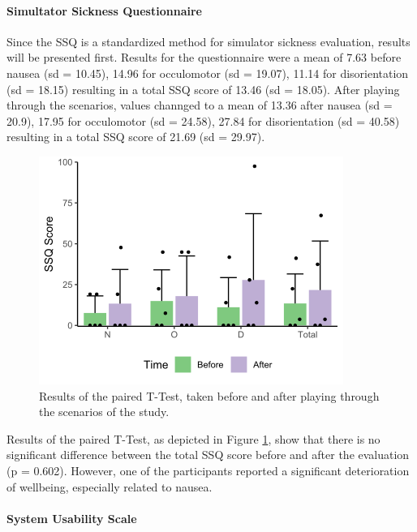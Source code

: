 \paragraph{Simultator Sickness Questionnaire}

Since the SSQ is a standardized method for simulator sickness evaluation, 
results will be presented first.
Results for the questionnaire were a mean of 7.63 before
nausea (sd = 10.45), 14.96 for occulomotor (sd = 19.07),
11.14 for disorientation (sd = 18.15)  resulting in 
a total SSQ score of 13.46 (sd = 18.05).
After playing through the scenarios, values channged to
a mean of 13.36 after
nausea (sd = 20.9), 17.95 for occulomotor (sd = 24.58),
27.84 for disorientation (sd = 40.58) resulting in 
a total SSQ score of 21.69 (sd = 29.97).

\begin{figure}[ht]
    \centering
    \includegraphics[width=0.7\linewidth]{images/evaluation/VR-SSQ.png}
    \caption{\label{fig::ssq}Results of the paired T-Test,
    taken before and after playing through the scenarios of the study.}
\end{figure}

Results of the paired T-Test, as depicted in Figure \ref{fig::ssq},
show that 
there is no significant difference between the total SSQ 
score before and after the evaluation (p = 0.602).
However, one of the participants reported a significant deterioration
of wellbeing, especially related to nausea.

\paragraph{System Usability Scale}

